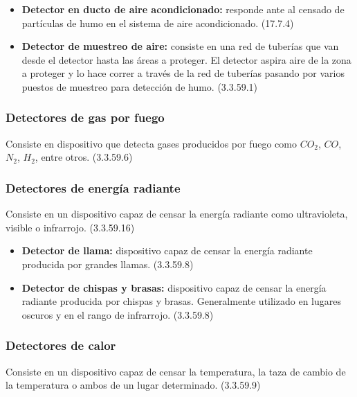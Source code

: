 \begin{itemize}
	\item \textbf{Detector en ducto de aire acondicionado:} responde ante al censado de partículas de humo en el sistema de aire acondicionado. (17.7.4)	
	
	\item \textbf{Detector de muestreo de aire:} consiste en una red de tuberías que van desde el detector hasta las áreas a proteger. El detector aspira aire de la zona a proteger y lo hace correr a través de la red de tuberías pasando por varios puestos de muestreo para detección de humo. (3.3.59.1)
		

\end{itemize}


\subsubsection{Detectores de gas por fuego}

Consiste en dispositivo que detecta gases producidos por fuego como $CO_{2}$, $CO$, $N_{2}$, $H_{2}$, entre otros. (3.3.59.6)


\subsubsection{Detectores de energía radiante}

Consiste en un dispositivo capaz de censar la energía radiante como ultravioleta, visible o infrarrojo. (3.3.59.16)


\begin{itemize}
	
	\item \textbf{Detector de llama:} dispositivo capaz de censar la energía radiante producida por grandes llamas. (3.3.59.8)
	
	\item \textbf{Detector de chispas y brasas:} dispositivo capaz de censar la energía radiante producida por chispas y brasas. Generalmente utilizado en lugares oscuros y en el rango de infrarrojo. (3.3.59.8)
	
\end{itemize}



\subsubsection{Detectores de calor}

Consiste en un dispositivo capaz de censar la temperatura, la taza de cambio de la temperatura o ambos de un lugar determinado. (3.3.59.9)


